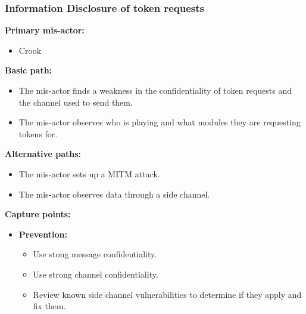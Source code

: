 \documentclass[a4paper,11pt]{report}
\begin{document}
\subsubsection{Information Disclosure of token requests}
\label{PlayerFlowCasesI1}
\textbf{Primary mis-actor:}
\begin{itemize}
\item Crook
\end{itemize}
\textbf{Basic path:}
\begin{itemize}
\item The mis-actor finds a weakness in the confidentiality of token requests and the channel used to send them.
\item The mis-actor observes who is playing and what modules they are requesting tokens for.
\end{itemize}
\textbf{Alternative paths:}
\begin{itemize}
\item The mis-actor sets up a MITM attack.
\item The mis-actor observes data through a side channel.
\end{itemize}
\textbf{Capture points:}
\begin{itemize}
\item \textbf{Prevention:}
\begin{itemize}
\item Use stong message confidentiality.
\item Use strong channel confidentiality.
\item Review known side channel vulnerabilities to determine if they apply and fix them.
\end{itemize}
\end{itemize}
\end{document}
